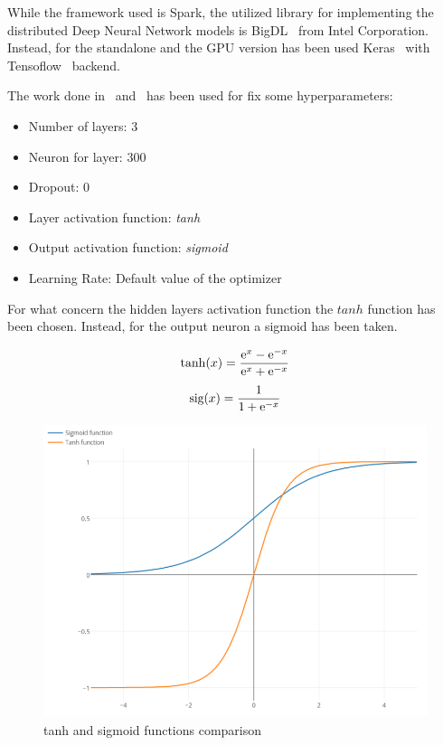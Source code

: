 While the framework used is Spark, the utilized library for implementing the
distributed Deep Neural Network models is BigDL~\cite{bigdl} from Intel
Corporation. Instead, for the standalone and the GPU version has been used
Keras~\cite{keras} with Tensoflow~\cite{tensorflow} backend.

The work done in~\cite{gaia} and~\cite{paper} has been used for fix some
hyperparameters:
\begin{itemize}
 \item Number of layers: $3$
 \item Neuron for layer: $300$
 \item Dropout: $0$
 \item Layer activation function: \textit{tanh}
 \item Output activation function: \textit{sigmoid}
 \item Learning Rate: Default value of the optimizer
\end{itemize}

For what concern the hidden layers activation function the
$tanh$ function has been chosen. Instead, for the output neuron a sigmoid
has been taken.
\begin{figure}[h]
 \begin{minipage}{.5\textwidth}
  \begin{equation*}
   \tanh(x) = \frac{\mathrm{e}^x-\mathrm{e}^{-x}}{\mathrm{e}^x+\mathrm{e}^{-x}}
  \end{equation*}
  \begin{equation*}
   \text{sig}(x)=\frac{1}{1+\mathrm{e}^{-x}}
  \end{equation*}
 \end{minipage}%
 \begin{minipage}{.5\textwidth}
  \centering
  \includegraphics[scale=0.3]{figures/SeT.png}
 \end{minipage}
 \caption{tanh and sigmoid functions comparison}
\end{figure}


